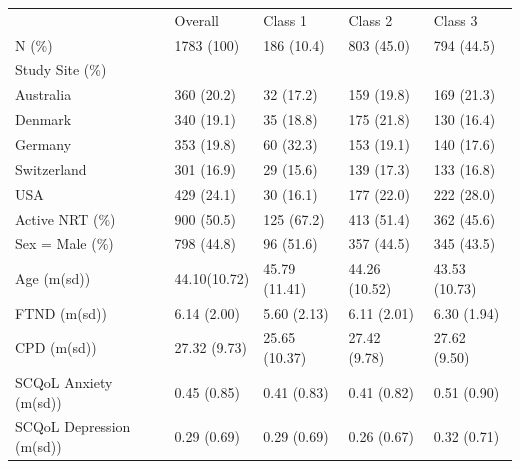 \documentclass[
	25pt,
	a0paper, 
	portrait,
	blockverticalspace=-3em,
	margin=.5in,
	innermargin=0mm
]{tikzposter}
\begin{document}
{\begin{columns}
\begin{minipage}[]{0.375\linewidth}
				\begin{tikzfigure}
					\begin{tabular}{lllll}
						\toprule
						& Overall & Class 1       & Class 2       & Class 3       \\
						\cmidrule{2-5}
						N (\%)                         & 1783 (100)      & 186 (10.4)    & 803 (45.0)    & 794 (44.5)    \\
						\midrule
						Study Site (\%)                &                 &               &               &               \\
						\hspace{3mm}Australia                      & 360 (20.2)      & 32 (17.2)     & 159 (19.8)    & 169 (21.3)    \\
						\hspace{3mm}Denmark                        & 340 (19.1)      & 35 (18.8)     & 175 (21.8)    & 130 (16.4)    \\
						\hspace{3mm}Germany                        & 353 (19.8)      & 60 (32.3)     & 153 (19.1)    & 140 (17.6)    \\
						\hspace{3mm}Switzerland                    & 301 (16.9)      & 29 (15.6)     & 139 (17.3)    & 133 (16.8)    \\
						\hspace{3mm}USA                            & 429 (24.1)      & 30 (16.1)     & 177 (22.0)    & 222 (28.0)    \\
						Active NRT (\%) & 900 (50.5)      & 125 (67.2)    & 413 (51.4)    & 362 (45.6)    \\
						Sex = Male (\%)                & 798 (44.8)      & 96 (51.6)     & 357 (44.5)    & 345 (43.5)    \\
						Age (m(sd))                & 44.10(10.72)    & 45.79 (11.41) & 44.26 (10.52) & 43.53 (10.73) \\
						FTND (m(sd))      & 6.14 (2.00)     & 5.60 (2.13)   & 6.11 (2.01)   & 6.30 (1.94)   \\
						CPD (m(sd))       & 27.32 (9.73)    & 25.65 (10.37) & 27.42 (9.78)  & 27.62 (9.50)  \\
						SCQoL Anxiety (m(sd))              & 0.45 (0.85)     & 0.41 (0.83)   & 0.41 (0.82)   & 0.51 (0.90)   \\
						SCQoL Depression (m(sd))       & 0.29 (0.69)     & 0.29 (0.69)   & 0.26 (0.67)   & 0.32 (0.71) \\
						\bottomrule
					\end{tabular}
				\label{tab:demographics}
	

\end{tikzfigure}
\end{minipage}
\end{columns}}
\end{document}

